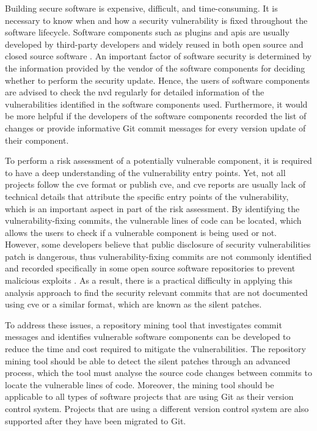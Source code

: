\documentclass[12pt, a4paper]{report}
\begin{document}
Building secure software is expensive, difficult, and time-consuming. It is necessary to know when
and how a security vulnerability is fixed throughout the software lifecycle. Software components
such as plugins and \acrfull{apis} are usually developed by third-party developers and widely reused
in both open source and closed source software \cite{khan_2001}. An important factor of software
security is determined by the information provided by the vendor of the software components for
deciding whether to perform the security update. Hence, the users of software components are advised
to check the \acrfull{nvd} \cite{nvd} regularly for detailed information of the vulnerabilities
identified in the software components used. Furthermore, it would be more helpful if the developers
of the software components recorded the list of changes or provide informative Git commit messages
for every version update of their component.

To perform a risk assessment of a potentially vulnerable component, it is required to have a deep
understanding of the vulnerability entry points. Yet, not all projects follow the \acrfull{cve}
format or publish \acrshort{cve}, and \acrshort{cve} reports are usually lack of technical details
that attribute the specific entry points of the vulnerability, which is an important aspect in part
of the risk assessment. By identifying the vulnerability-fixing commits, the vulnerable lines of
code can be located, which allows the users to check if a vulnerable component is being used or not.
However, some developers believe that public disclosure of security vulnerabilities patch is
dangerous, thus vulnerability-fixing commits are not commonly identified and recorded specifically
in some open source software repositories to prevent malicious exploits \cite{arora_2005}. As a
result, there is a practical difficulty in applying this analysis approach to find the security
relevant commits that are not documented using \acrshort{cve} or a similar format, which are known
as the silent patches.

To address these issues, a repository mining tool that investigates commit messages and identifies
vulnerable software components can be developed to reduce the time and cost required to mitigate the
vulnerabilities. The repository mining tool should be able to detect the silent patches through an
advanced process, which the tool must analyse the source code changes between commits to locate the
vulnerable lines of code. Moreover, the mining tool should be applicable to all types of software
projects that are using Git as their version control system. Projects that are using a different
version control system are also supported after they have been migrated to Git.
\end{document}
